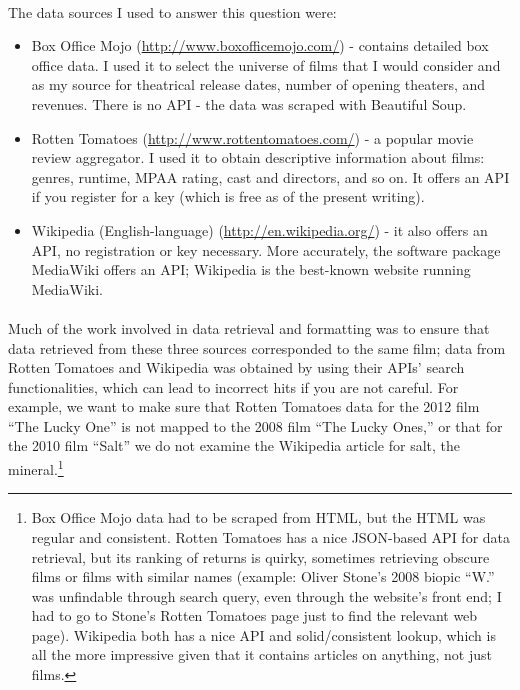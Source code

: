 \documentclass[10pt]{article}
\begin{document}
    \paragraph{}
    The data sources I used to answer this question were: 
    
    \begin{itemize}
        \item Box Office Mojo (\url{http://www.boxofficemojo.com/}) - contains detailed box office data. I used it to select the universe of films that I would consider and as my source for theatrical release dates, number of opening theaters, and revenues. There is no API - the data was scraped with Beautiful Soup. 
        \item Rotten Tomatoes (\url{http://www.rottentomatoes.com/}) - a popular movie review aggregator. I used it to obtain descriptive information about films: genres, runtime, MPAA rating, cast and directors, and so on. It offers an API if you register for a key (which is free as of the present writing). 
        \item Wikipedia (English-language) (\url{http://en.wikipedia.org/}) - it also offers an API, no registration or key necessary. More accurately, the software package MediaWiki offers an API; Wikipedia is the best-known website running MediaWiki. 
    \end{itemize}
    
    \paragraph{}
    Much of the work involved in data retrieval and formatting was to ensure that data retrieved from these three sources corresponded to the same film; data from Rotten Tomatoes and Wikipedia was obtained by using their APIs' search functionalities, which can lead to incorrect hits if you are not careful. For example, we want to make sure that Rotten Tomatoes data for the 2012 film ``The Lucky One'' is not mapped to the 2008 film ``The Lucky Ones,'' or that for the 2010 film ``Salt'' we do not examine the Wikipedia article for salt, the mineral.\footnote{Box Office Mojo data had to be scraped from HTML, but the HTML was regular and consistent. Rotten Tomatoes has a nice JSON-based API for data retrieval, but its ranking of returns is quirky, sometimes retrieving obscure films or films with similar names (example: Oliver Stone's 2008 biopic ``W.'' was unfindable through search query, even through the website's front end; I had to go to Stone's Rotten Tomatoes page just to find the relevant web page). Wikipedia both has a nice API and solid/consistent lookup, which is all the more impressive given that it contains articles on anything, not just films.} 
    
\end{document}
